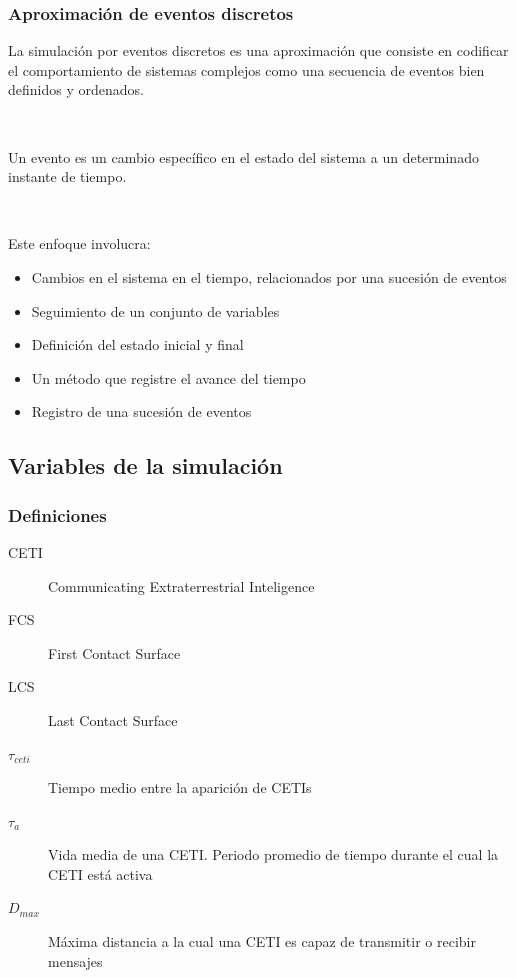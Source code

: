 \documentclass[handout]{beamer}
\theoremstyle{plain}
\theoremstyle{definition}
\theoremstyle{remark}
\begin{document}
\begin{frame}\frametitle{Aproximación de eventos discretos}

   La \alert{simulación por eventos discretos} es una aproximación que
   consiste en codificar el comportamiento de sistemas complejos 
   como una secuencia de eventos bien definidos y ordenados.

   \

   Un \alert{evento} es un cambio específico en el estado del sistema a un
   determinado instante de tiempo.

   \

   Este enfoque involucra:

   \begin{itemize}
      \item Cambios en el sistema en el tiempo, relacionados
         por una sucesión de eventos
      \item Seguimiento de un conjunto de variables
      \item Definición del estado inicial y final
      \item Un método que registre el avance del tiempo
      \item Registro de una sucesión de eventos
   \end{itemize}                        
  
\end{frame}%
              


\subsection{Variables de la simulación}
 
\begin{frame}\frametitle{Definiciones}

   \begin{description}
      \item[CETI]  Communicating Extraterrestrial Inteligence
      \item[FCS] First Contact Surface 
      \item[LCS] Last Contact Surface 
      \item[$\tau_{ceti}$] Tiempo medio entre la aparición de CETIs
      \item[$\tau_{a}$] Vida media de una CETI.  Periodo promedio de tiempo
         durante el cual la CETI está activa
      \item[$D_{max}$] Máxima distancia a la cual una CETI es capaz de
         transmitir o recibir mensajes
   \end{description}

\end{frame}%
 
\end{document}
